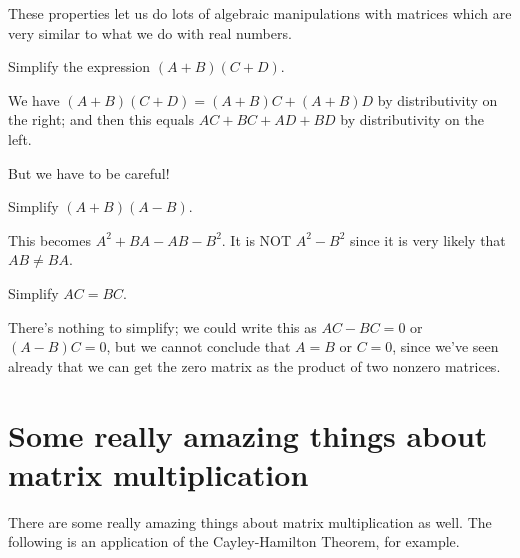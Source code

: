 These properties let us do lots of algebraic manipulations with
matrices which are very similar to what we do with real numbers.

\begin{myprob}
Simplify the expression $(A+B)(C+D)$.

\begin{mysol}
We have $(A+B)(C+D) = (A+B)C + (A+B)D$ by distributivity on the right;
and then this equals $AC + BC + AD + BD$ by distributivity on the left.
\end{mysol}\end{myprob}

But we have to be careful!

\begin{myprob} Simplify $(A+B)(A-B)$.

\begin{mysol} This becomes $A^2 + BA - AB - B^2$.  It is NOT $A^2-B^2$ since
it is very likely that $AB \neq BA$.
\end{mysol}\end{myprob}

\begin{myprob} Simplify $AC = BC$.

\begin{mysol} There's nothing to simplify; we could write this as $AC-BC = 0$ or
$(A-B)C = 0$, but we cannot conclude that $A=B$ or $C=0$, since we've
seen already that we can get the zero matrix as the product of two
nonzero matrices.
\end{mysol}\end{myprob}



\section{Some really amazing things about matrix multiplication}

There are some really amazing things about matrix multiplication as
well.  The following is an application of the Cayley-Hamilton Theorem,
for example.

